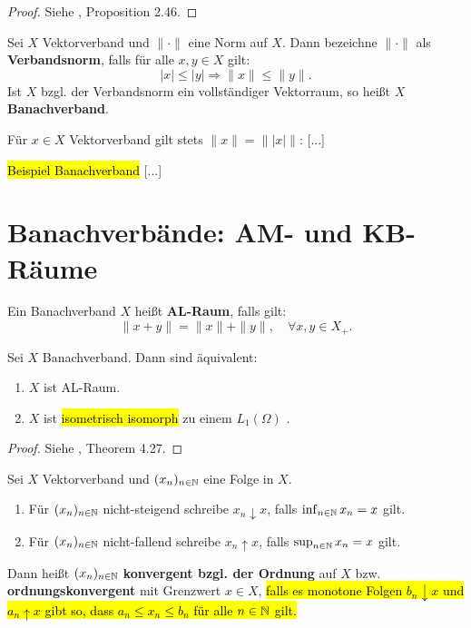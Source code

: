 \begin{proof}
Siehe \cite{banasiak_arlotti_2006}, Proposition 2.46.
\end{proof}

\begin{defi}
Sei $X$ Vektorverband und $\|\cdot\|$ eine Norm auf $X$. Dann bezeichne  $\|\cdot\|$ als \textbf{Verbandsnorm}, falls für alle $x,y\in X$ gilt:
\begin{equation*}\label{identity}
|x |\leq  |y |\Rightarrow  \|x \|\leq  \|y \|.
\end{equation*}
Ist $X$  bzgl. der Verbandsnorm  ein vollständiger Vektorraum, so heißt $X$ \textbf{Banachverband}.
\end{defi}

\begin{bem}
Für $x\in X$ Vektorverband gilt stets $\|x \| =  \| |x | \|$: [...]
\end{bem}

\begin{bsp}
\hl{Beispiel Banachverband} [...]
\end{bsp}

\section{Banachverbände: AM- und KB-Räume}

\begin{defi} 
Ein Banachverband $X$ heißt \textbf{AL-Raum}, falls gilt:
\begin{equation*}
\|x+y\|=\|x\|+\|y\|,\quad\forall x,y\in X_+.
\end{equation*}
\end{defi}

\begin{fsatz}
Sei $X$ Banachverband. Dann sind äquivalent:
\begin{enumerate}
\item $X$ ist AL-Raum.
\item $X$ ist \hl{isometrisch isomorph} zu einem $L_1(\Omega)$ .
\end{enumerate}
\end{fsatz}

\begin{proof}
Siehe \cite{aliprantis_burkinshaw_2006}, Theorem 4.27.
\end{proof}

\begin{defi}
Sei $X$ Vektorverband und $(x_n)_{n\in\mathbb{N}}$ eine Folge in $X$.
\begin{enumerate}
\item Für $(x_n)_{n\in\mathbb{N}}$ nicht-steigend schreibe  $x_n\downarrow x$, falls $\inf_{n\in\mathbb{N}} x_n=x$ gilt.
\item Für $(x_n)_{n\in\mathbb{N}}$ nicht-fallend schreibe $x_n\uparrow x$, falls $\sup_{n\in\mathbb{N}} x_n=x$ gilt.
\end{enumerate}
Dann heißt $(x_n)_{n\in\mathbb{N}}$ \textbf{konvergent bzgl. der Ordnung} auf $X$ bzw. \textbf{ordnungskonvergent} mit Grenzwert $x\in X$, \hl{falls es monotone Folgen $b_n\downarrow x$ und $a_n\uparrow x$ gibt so, dass $a_n\leq x_n\leq b_n$ für alle $n\in\mathbb{N}$ gilt.}
\end{defi}


